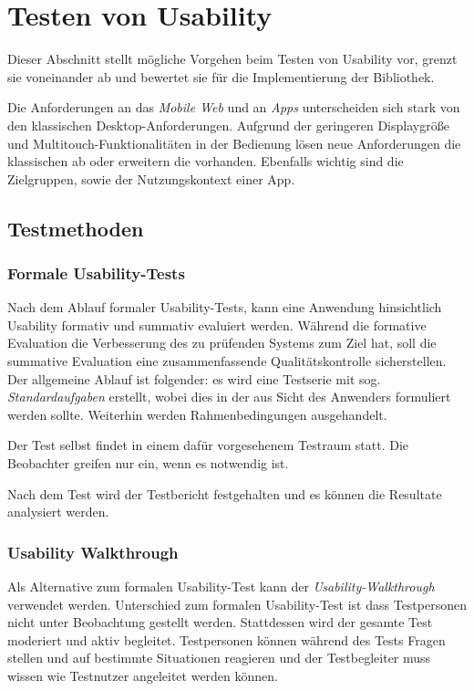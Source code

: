 \section{Testen von Usability}
\label{usability_testing}

Dieser Abschnitt stellt mögliche Vorgehen beim Testen von Usability vor, grenzt sie voneinander ab und bewertet sie für die Implementierung der Bibliothek. 

Die Anforderungen an das \textit{Mobile Web} und an \textit{Apps} unterscheiden sich stark von den klassischen Desktop-Anforderungen. 
Aufgrund der geringeren Displaygröße und Multitouch-Funktionalitäten in der Bedienung lösen neue Anforderungen die klassischen ab oder erweitern die vorhanden. 
Ebenfalls wichtig sind die Zielgruppen, sowie der Nutzungskontext einer App. \cite[vgl.]{usabilityblog_wasBeachten}

\subsection{Testmethoden \label{sec:testmethoden}}

\subsubsection{Formale Usability-Tests \label{sec:formal-usability-test}}

Nach dem Ablauf formaler Usability-Tests, kann eine Anwendung hinsichtlich Usability formativ und summativ evaluiert werden. 
Während die formative Evaluation die Verbesserung des zu prüfenden Systems zum Ziel hat, soll die summative Evaluation eine zusammenfassende Qualitätskontrolle sicherstellen. Der allgemeine Ablauf ist folgender: es wird eine Testserie mit sog. \textit{Standardaufgaben} erstellt, wobei dies in der aus Sicht des Anwenders formuliert werden sollte.
Weiterhin werden Rahmenbedingungen ausgehandelt. \cite[vgl.][86\psq]{usabilityEngineeringKompakt}

Der Test selbst findet in einem dafür vorgesehenem Testraum statt. 
Die Beobachter greifen nur ein, wenn es notwendig ist. 

Nach dem Test wird der Testbericht festgehalten und es können die Resultate analysiert werden. 

\subsubsection{Usability Walkthrough}

Als Alternative zum formalen Usability-Test kann der \textit{Usability-Walkthrough} verwendet werden. 
Unterschied zum formalen Usability-Test ist dass Testpersonen nicht unter Beobachtung gestellt werden. 
Stattdessen wird der gesamte Test moderiert und aktiv begleitet. 
Testpersonen können während des Tests Fragen stellen und auf bestimmte Situationen reagieren und der Testbegleiter muss wissen wie Testnutzer angeleitet werden können. \cite[vgl.][93]{usabilityEngineeringKompakt}

